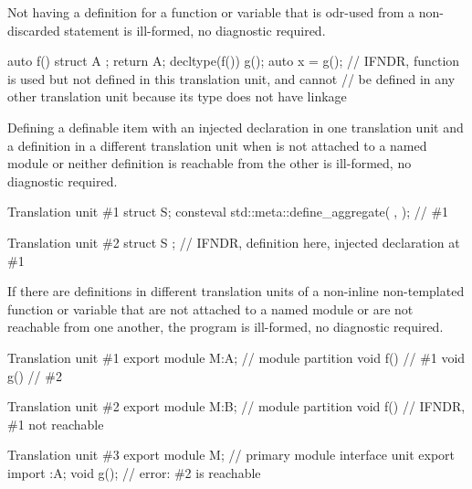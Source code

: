 
\pnum
Not having a definition
for a function or variable
that is odr-used from a non-discarded statement
is ill-formed, no diagnostic required.

\pnum
\begin{example}
\begin{codeblock}
auto f() {
  struct A {};
  return A{};
}
decltype(f()) g();
auto x = g();   // IFNDR, function  is used but not defined in this translation unit, and cannot
                // be defined in any other translation unit because its type does not have linkage
\end{codeblock}
\end{example}


\pnum
Defining a definable item 
with an injected declaration
in one translation unit and
a definition in a different translation unit
when  is not attached to a named module
or neither definition is reachable from the other
is ill-formed, no diagnostic required.

\pnum
\begin{example}
\begin{codeblocktu}{Translation unit \#1}
struct S;
consteval { std::meta::define_aggregate(^^S, {}); }     // \#1
\end{codeblocktu}
\begin{codeblocktu}{Translation unit \#2}
struct S {};    // IFNDR, definition here, injected declaration at \#1
\end{codeblocktu}
\end{example}


\pnum
If there are definitions
in different translation units
of a non-inline non-templated function or variable
that are not attached to a named module
or are not reachable from one another,
the program is ill-formed, no diagnostic required.

\pnum
\begin{example}
\begin{codeblocktu}{Translation unit \#1}
export module M:A;  // module partition
void f() {}         // \#1
void g() {}         // \#2
\end{codeblocktu}
\begin{codeblocktu}{Translation unit \#2}
export module M:B;  // module partition
void f() {}         // IFNDR, \#1 not reachable
\end{codeblocktu}
\begin{codeblocktu}{Translation unit \#3}
export module M;    // primary module interface unit
export import :A;
void g();           // error: \#2 is reachable
\end{codeblocktu}
\end{example}

